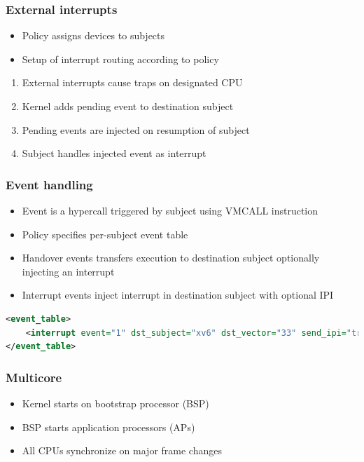 \documentclass[xcolor={dvipsnames}]{beamer}
\begin{document}
\begin{frame}\frametitle{External interrupts}
\begin{itemize}
	\item Policy assigns devices to subjects
	\item Setup of interrupt routing according to policy
\end{itemize}
\begin{center}
	
\end{center}
\begin{enumerate}
	\item External interrupts cause traps on designated CPU
	\item Kernel adds pending event to destination subject
	\item Pending events are injected on resumption of subject
	\item Subject handles injected event as interrupt
\end{enumerate}
\end{frame}

\begin{frame}[fragile]\frametitle{Event handling}
\begin{itemize}
	\item Event is a hypercall triggered by subject using VMCALL instruction
	\item Policy specifies per-subject event table
	\item Handover events transfers execution to destination subject optionally injecting an interrupt
	\item Interrupt events inject interrupt in destination subject with optional IPI
\end{itemize}
\begin{lstlisting}[language=xml]
<event_table>
    <interrupt event="1" dst_subject="xv6" dst_vector="33" send_ipi="true"/>
</event_table>
\end{lstlisting}
\end{frame}

\begin{frame}\frametitle{Multicore}
\begin{itemize}
	\item Kernel starts on bootstrap processor (BSP)
	\item BSP starts application processors (APs)
	\item All CPUs synchronize on major frame changes
\end{itemize}
	
\end{frame}
\end{document}
